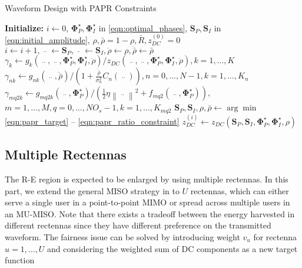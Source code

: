 \begin{algorithm}
  \caption{Waveform Design with PAPR Constraints}
  \label{alg:papr}
  \begin{algorithmic}[1]
    \State \textbf{Initialize:} $i \leftarrow 0$, ${\mathbf{\Phi }}_P^ \star ,{\mathbf{\Phi }}_I^ \star $ in \eqref{eqn:optimal_phases}, ${{{\mathbf{S}}_P},{{\mathbf{S}}_I}}$ in \eqref{eqn:initial_amplitude}, $\rho ,\bar \rho  = 1 - \rho ,\bar R,z_{DC}^{(0)} = 0$
    \Repeat
      \State $i \leftarrow i + 1,\mathop {{{\mathbf{S}}_P}}\limits^{..}  \leftarrow {{\mathbf{S}}_P},\mathop {{{\mathbf{S}}_I}}\limits^{..}  \leftarrow {{\mathbf{S}}_I},\ddot \rho  \leftarrow \rho ,\ddot{\bar{\rho}}  \leftarrow \bar \rho $
      \State ${\gamma _k} \leftarrow {g_k}\left( {\mathop {{{\mathbf{S}}_P}}\limits^{..} ,\mathop {{{\mathbf{S}}_I}}\limits^{..} ,{\mathbf{\Phi }}_P^ \star ,{\mathbf{\Phi }}_I^ \star ,\ddot \rho } \right)/{z_{DC}}\left( {\mathop {{{\mathbf{S}}_P}}\limits^{..} ,\mathop {{{\mathbf{S}}_I}}\limits^{..} ,{\mathbf{\Phi }}_P^ \star ,{\mathbf{\Phi }}_I^ \star ,\ddot \rho } \right),k = 1, \ldots ,K$
      \State ${\gamma _{nk}} \leftarrow {g_{nk}}\left( {\mathop {{{\mathbf{S}}_I}}\limits^{..} ,\ddot{\bar{\rho}}} \right)/\left( {1 + \frac{{\ddot{\bar{\rho}}}}{{\sigma _n^2}}{C_n}\left( {\mathop {{{\mathbf{S}}_I}}\limits^{..} } \right)} \right),n = 0, \ldots ,N - 1,k = 1, \ldots ,{K_n}$
      \State ${\gamma _{mq2k}} \leftarrow {g_{mq2k}}\left( {\mathop {{{\mathbf{S}}_P}}\limits^{..} ,{\mathbf{\Phi }}_P^ \star } \right)/\left( {\frac{1}{2}\eta {{\left\| {\mathop {{{\mathbf{s}}_{P,m}}}\limits^{..} } \right\|}^2} + {f_{mq2}}\left( {\mathop {{{\mathbf{S}}_P}}\limits^{..} ,{\mathbf{\Phi }}_P^ \star } \right)} \right),$
      \Statex $m = 1, \ldots ,M,q = 0, \ldots ,N{O_s} - 1,k = 1, \ldots ,{K_{mq2}}$
      \State ${{\mathbf{S}}_P},{{\mathbf{S}}_I},\rho ,\bar \rho  \leftarrow \arg \min $ \eqref{eqn:papr_target} -- \eqref{eqn:papr_ratio_constraint}
      \State $z_{DC}^{(i)} \leftarrow {z_{DC}}\left( {{{\mathbf{S}}_P},{{\mathbf{S}}_I},{\mathbf{\Phi }}_P^ \star ,{\mathbf{\Phi }}_I^ \star ,\rho } \right)$
  \end{algorithmic}
\end{algorithm}



\subsection{Multiple Rectennas}\label{sec:multiple-rectennas}
The R-E region is expected to be enlarged by using multiple rectennas. In this part, we extend the general MISO strategy in \cite{Clerckx2018} to $U$ rectennas, which can either serve a single user in a point-to-point MIMO or spread across multiple users in an MU-MISO. Note that there exists a tradeoff between the energy harvested in different rectennas since they have different preference on the transmitted waveform. The fairness issue can be solved by introducing weight ${v_u}$ for rectenna $u = 1, \ldots ,U$ and considering the weighted sum of DC components as a new target function

